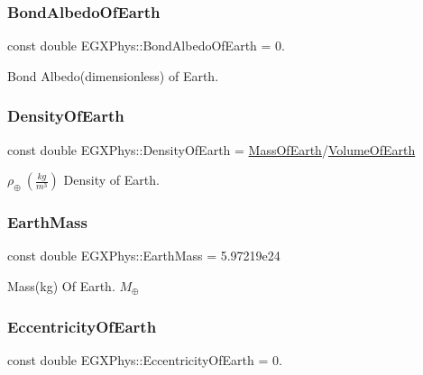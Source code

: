 \subsubsection{\texorpdfstring{Bond\+Albedo\+Of\+Earth}{BondAlbedoOfEarth}}
{\footnotesize\ttfamily const double E\+G\+X\+Phys\+::\+Bond\+Albedo\+Of\+Earth = 0.}

Bond Albedo(dimensionless) of Earth. \mbox{\label{namespace_e_g_x_phys_a2a671e37351b9b7e334385a26a7f7102}} 
\subsubsection{\texorpdfstring{Density\+Of\+Earth}{DensityOfEarth}}
{\footnotesize\ttfamily const double E\+G\+X\+Phys\+::\+Density\+Of\+Earth = \mbox{\hyperlink{namespace_e_g_x_phys_ace4a9d8c0b21215536857f4c1087a4e8}{Mass\+Of\+Earth}}/\mbox{\hyperlink{namespace_e_g_x_phys_a73aaaddeacf5d59643ec5e4a53a1a251}{Volume\+Of\+Earth}}}

$\rho_\oplus\ (\frac{kg}{m^3})$ Density of Earth. \mbox{\label{namespace_e_g_x_phys_a9f866a7985fe2676a1e50a3dd175f5b6}} 
\subsubsection{\texorpdfstring{Earth\+Mass}{EarthMass}}
{\footnotesize\ttfamily const double E\+G\+X\+Phys\+::\+Earth\+Mass = 5.\+97219e24}

Mass(kg) Of Earth. $M_\oplus$ \mbox{\label{namespace_e_g_x_phys_a327bbaf59d546f8524d6fb9da919d939}} 
\subsubsection{\texorpdfstring{Eccentricity\+Of\+Earth}{EccentricityOfEarth}}
{\footnotesize\ttfamily const double E\+G\+X\+Phys\+::\+Eccentricity\+Of\+Earth = 0.}

